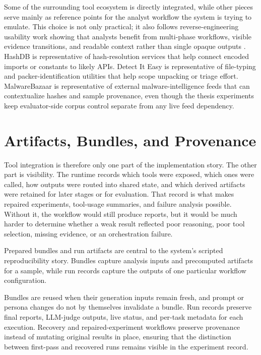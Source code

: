 Some of the surrounding tool ecosystem is directly integrated, while other pieces serve mainly as reference points for the analyst workflow the system is trying to emulate. This choice is not only practical; it also follows reverse-engineering usability work showing that analysts benefit from multi-phase workflows, visible evidence transitions, and readable context rather than single opaque outputs \cite{mattei2022reusability,yakdan2016johnny}. HashDB \cite{hashdb2025} is representative of hash-resolution services that help connect encoded imports or constants to likely APIs. Detect It Easy \cite{detectiteasy2025} is representative of file-typing and packer-identification utilities that help scope unpacking or triage effort. MalwareBazaar \cite{malwarebazaar2025} is representative of external malware-intelligence feeds that can contextualize hashes and sample provenance, even though the thesis experiments keep evaluator-side corpus control separate from any live feed dependency.

\section{Artifacts, Bundles, and Provenance}

Tool integration is therefore only one part of the implementation story. The other part is visibility. The runtime records which tools were exposed, which ones were called, how outputs were routed into shared state, and which derived artifacts were retained for later stages or for evaluation. That record is what makes repaired experiments, tool-usage summaries, and failure analysis possible. Without it, the workflow would still produce reports, but it would be much harder to determine whether a weak result reflected poor reasoning, poor tool selection, missing evidence, or an orchestration failure.

Prepared bundles and run artifacts are central to the system's scripted reproducibility story. Bundles capture analysis inputs and precomputed artifacts for a sample, while run records capture the outputs of one particular workflow configuration.

Bundles are reused when their generation inputs remain fresh, and prompt or persona changes do not by themselves invalidate a bundle. Run records preserve final reports, LLM-judge outputs, live status, and per-task metadata for each execution. Recovery and repaired-experiment workflows preserve provenance instead of mutating original results in place, ensuring that the distinction between first-pass and recovered runs remains visible in the experiment record.

